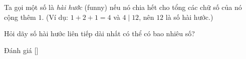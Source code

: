 \ifshowproblem
\begin{problem}\label{problem:RUS-2015-TMO-J-P2}
    Ta gọi một số là \textit{hài hước} (funny) nếu nó chia hết cho tổng các chữ số của nó cộng thêm \(1\).  
    (Ví dụ: \(1 + 2 + 1 = 4\) và \(4 \mid 12\), nên \(12\) là số hài hước.)
    
    Hỏi dãy số hài hước liên tiếp dài nhất có thể có bao nhiêu số?
\end{problem}
\fi

\ifshowinfo
Đánh giá [\textbf{}]\footnotemark
{}
\fi
